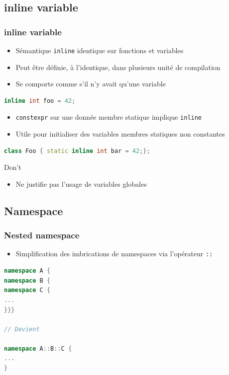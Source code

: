 \documentclass[C++.tex]{subfiles}
\begin{document}
\subsection*{inline variable}
\begin{frame}[fragile]
	\frametitle{inline variable}
	\begin{itemize}
		\item Sémantique \lstinline|inline| identique sur fonctions et variables
		\item Peut être définie, à l'identique, dans plusieurs unité de compilation
		\item Se comporte comme s'il n'y avait qu'une variable
	\end{itemize}

	\begin{lstlisting}[language=C++]
inline int foo = 42;\end{lstlisting}

	\begin{itemize}
		\item \lstinline|constexpr| sur une donnée membre statique implique \lstinline|inline|
		\item Utile pour initialiser des variables membres statiques non constantes
	\end{itemize}

	\begin{lstlisting}[language=C++]
class Foo { static inline int bar = 42;};\end{lstlisting}

	\begin{alertblock}{Don't}
		\begin{itemize}
			\item Ne justifie pas l'usage de variables globales
		\end{itemize}
	\end{alertblock}
\end{frame}

\subsection*{Namespace}
\begin{frame}[fragile]
	\frametitle{Nested namespace}
	\begin{itemize}
		\item Simplification des imbrications de namespaces via l'opérateur \lstinline|::| 
	\end{itemize}

	\begin{lstlisting}[language=C++]
namespace A {
namespace B {
namespace C {
...
}}}

// Devient

namespace A::B::C {
...
}\end{lstlisting}
\end{frame}
\end{document}

